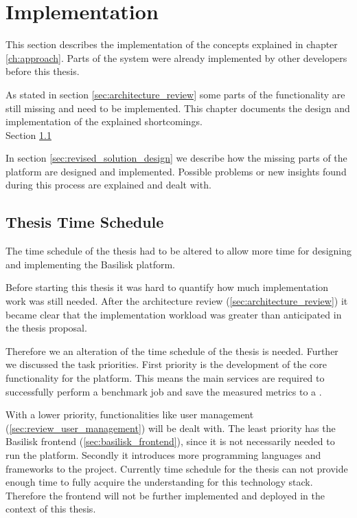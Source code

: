 \chapter{Implementation}
\label{ch:implementation}



This section describes the implementation of the concepts explained in chapter \ref{ch:approach}.
Parts of the system were already implemented by other developers before this thesis.

As stated in section \ref{sec:architecture_review} some parts of the functionality are still missing and need to be implemented.
This chapter documents the design and implementation of the explained shortcomings.
\\

Section \ref{sec:time_schedule}


In section \ref{sec:revised_solution_design} we describe how the missing parts of the platform are designed and implemented.
Possible problems or new insights found during this process are explained and dealt with.



\section{Thesis Time Schedule}
\label{sec:time_schedule}
The time schedule of the thesis had to be altered to allow more time for designing and implementing the Basilisk platform.

Before starting this thesis it was hard to quantify how much implementation work was still needed.
After the architecture review (\ref{sec:architecture_review}) it became clear that the implementation workload was greater than anticipated in the thesis proposal.

Therefore we an alteration of the time schedule of the thesis is needed.
Further we discussed the task priorities.
First priority is the development of the core functionality for the platform.
This means the main services are required to successfully perform a benchmark job and save the measured metrics to a \ts{}.

With a lower priority, functionalities like user management (\ref{sec:review_user_management}) will be dealt with.
The least priority has the Basilisk frontend (\ref{sec:basilisk_frontend}), since it is not necessarily needed to run the platform.
Secondly it introduces more programming languages and frameworks to the project.
Currently time schedule for the thesis can not provide enough time to fully acquire the understanding for this technology stack.
Therefore the frontend will not be further implemented and deployed in the context of this thesis.



